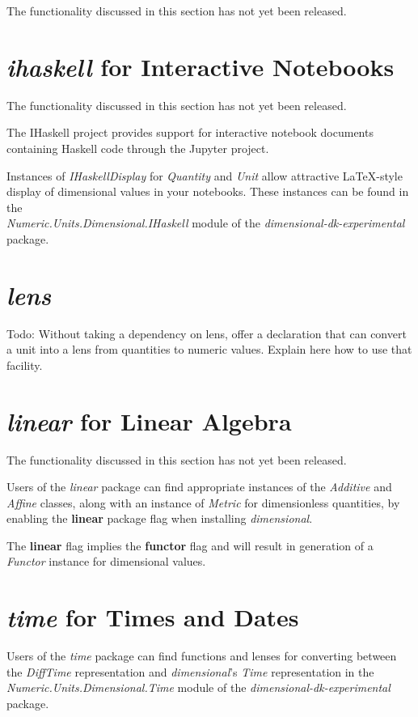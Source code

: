 \documentclass[11pt]{report}
\newcommand{\packagename}[1]{\textit{#1}}
\newcommand{\thispackage}{\packagename{dimensional}}
\newcommand{\experimentalpackage}{\packagename{dimensional-dk-experimental}}
\newcommand{\classname}[1]{\textit{#1}}
\newcommand{\typename}[1]{\textit{#1}}
\newcommand{\modulename}[1]{\textit{#1}}
\newcommand{\submodule}[1]{\modulename{Numeric.Units.Dimensional.{#1}}}
\newcommand{\flag}[1]{\textbf{#1}}
\newcommand{\prerelease}{\begin{framed}
The functionality discussed in this section has not yet been released.
\end{framed}}
\begin{document}
\prerelease{}

\section{\packagename{ihaskell} for Interactive Notebooks}

\prerelease{}

The IHaskell project provides support for interactive notebook documents containing
Haskell code through the Jupyter project.

Instances of \classname{IHaskellDisplay} for \typename{Quantity} and \typename{Unit}
allow attractive \LaTeX{}-style display of dimensional values in your notebooks. These
instances can be found in the \\
\submodule{IHaskell} module of the \experimentalpackage{}
package.

\section{\packagename{lens}}

Todo: Without taking a dependency on lens, offer a declaration that can convert a unit into a lens from quantities to numeric values.
Explain here how to use that facility.

\section{\packagename{linear} for Linear Algebra}

\prerelease{}

Users of the \packagename{linear} package can find appropriate instances of
the \classname{Additive} and \classname{Affine} classes, along with an
instance of \classname{Metric} for dimensionless quantities, by enabling the \flag{linear}
package flag when installing \thispackage{}.

The \flag{linear} flag implies the \flag{functor} flag and will result in generation of a \classname{Functor}
instance for dimensional values.

\section{\packagename{time} for Times and Dates}

Users of the \packagename{time} package can find functions and lenses for converting
between the \typename{DiffTime} representation and \thispackage{}'s \typename{Time} representation in the
\submodule{Time} module of the \experimentalpackage{} package.
\end{document}

